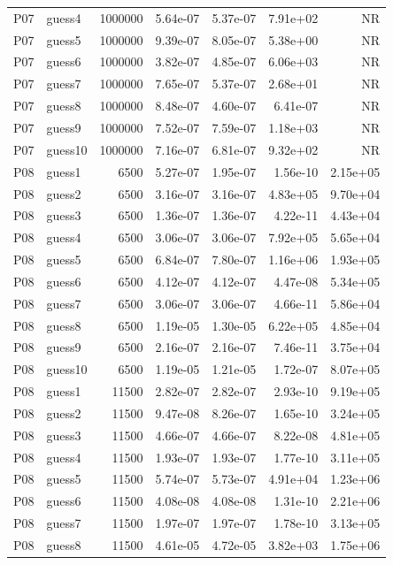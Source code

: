{\begin{longtable}{llrrrrr}
P07 & guess4 & 1000000 & 5.64e-07 & 5.37e-07 & 7.91e+02 & NR \\
P07 & guess5 & 1000000 & 9.39e-07 & 8.05e-07 & 5.38e+00 & NR \\
P07 & guess6 & 1000000 & 3.82e-07 & 4.85e-07 & 6.06e+03 & NR \\
P07 & guess7 & 1000000 & 7.65e-07 & 5.37e-07 & 2.68e+01 & NR \\
P07 & guess8 & 1000000 & 8.48e-07 & 4.60e-07 & 6.41e-07 & NR \\
P07 & guess9 & 1000000 & 7.52e-07 & 7.59e-07 & 1.18e+03 & NR \\
P07 & guess10 & 1000000 & 7.16e-07 & 6.81e-07 & 9.32e+02 & NR \\
P08 & guess1 & 6500 & 5.27e-07 & 1.95e-07 & 1.56e-10 & 2.15e+05 \\
P08 & guess2 & 6500 & 3.16e-07 & 3.16e-07 & 4.83e+05 & 9.70e+04 \\
P08 & guess3 & 6500 & 1.36e-07 & 1.36e-07 & 4.22e-11 & 4.43e+04 \\
P08 & guess4 & 6500 & 3.06e-07 & 3.06e-07 & 7.92e+05 & 5.65e+04 \\
P08 & guess5 & 6500 & 6.84e-07 & 7.80e-07 & 1.16e+06 & 1.93e+05 \\
P08 & guess6 & 6500 & 4.12e-07 & 4.12e-07 & 4.47e-08 & 5.34e+05 \\
P08 & guess7 & 6500 & 3.06e-07 & 3.06e-07 & 4.66e-11 & 5.86e+04 \\
P08 & guess8 & 6500 & 1.19e-05 & 1.30e-05 & 6.22e+05 & 4.85e+04 \\
P08 & guess9 & 6500 & 2.16e-07 & 2.16e-07 & 7.46e-11 & 3.75e+04 \\
P08 & guess10 & 6500 & 1.19e-05 & 1.21e-05 & 1.72e-07 & 8.07e+05 \\
P08 & guess1 & 11500 & 2.82e-07 & 2.82e-07 & 2.93e-10 & 9.19e+05 \\
P08 & guess2 & 11500 & 9.47e-08 & 8.26e-07 & 1.65e-10 & 3.24e+05 \\
P08 & guess3 & 11500 & 4.66e-07 & 4.66e-07 & 8.22e-08 & 4.81e+05 \\
P08 & guess4 & 11500 & 1.93e-07 & 1.93e-07 & 1.77e-10 & 3.11e+05 \\
P08 & guess5 & 11500 & 5.74e-07 & 5.73e-07 & 4.91e+04 & 1.23e+06 \\
P08 & guess6 & 11500 & 4.08e-08 & 4.08e-08 & 1.31e-10 & 2.21e+06 \\
P08 & guess7 & 11500 & 1.97e-07 & 1.97e-07 & 1.78e-10 & 3.13e+05 \\
P08 & guess8 & 11500 & 4.61e-05 & 4.72e-05 & 3.82e+03 & 1.75e+06 \\

\end{longtable}}
